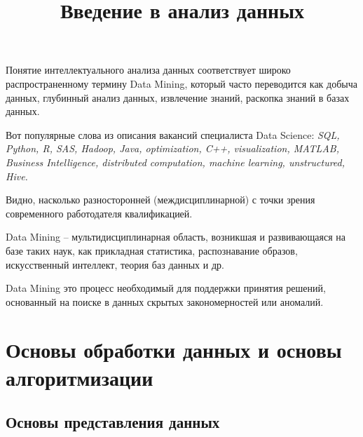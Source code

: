 \documentclass{beamer}
\title{Введение в анализ данных}
\begin{document}
\maketitle




 


\begin{frame}
Понятие интеллектуального анализа данных соответствует широко
распространенному термину Data Mining, который часто переводится как
добыча данных, глубинный анализ данных, извлечение знаний, раскопка
знаний в базах данных.
\end{frame}

\begin{frame}

Вот  популярные слова   из описания вакансий  специалиста Data Science: 
\it{
SQL, Python, R,  SAS, Hadoop, Java, 
optimization, C++, visualization, MATLAB,  Business Intelligence, 
distributed computation, 
machine learning, 
unstructured,
Hive.}


Видно, насколько разносторонней (междисциплинарной) с
точки зрения современного работодателя квалификацией.   


\end{frame}


\begin{frame}

Data Mining -- мультидисциплинарная область, возникшая и развивающаяся на базе таких наук, 
как прикладная статистика, распознавание образов, искусственный интеллект, теория баз данных и др.

 Data Mining это процесс необходимый для  поддержки принятия решений, основанный на
поиске в данных скрытых закономерностей или аномалий.

\end{frame}
 


\section{Основы обработки данных и  основы алгоритмизации}

\subsection{Основы представления данных}
\end{document}
